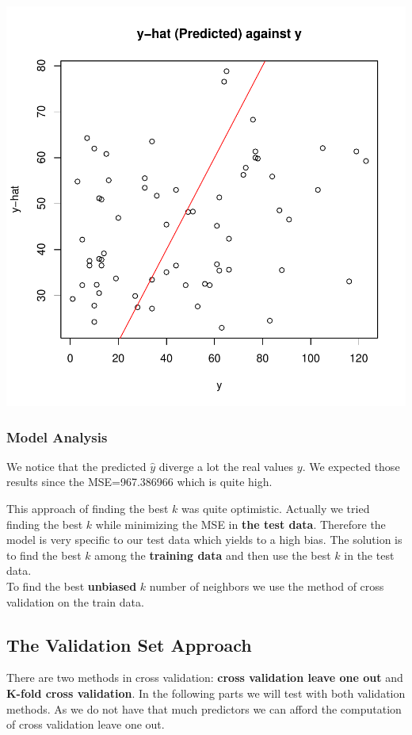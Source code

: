 \documentclass[]{report}
\begin{document}
\begin{center}
	\includegraphics{Figures/knn_predicted_test.pdf}
\end{center}

\subsubsection{Model Analysis}

We notice that the predicted {$\hat{y}$} diverge a lot the real values $y$. We expected those results since the MSE=967.386966 which is quite high. 

This approach of finding the best $k$ was quite optimistic. Actually we tried finding the best $k$ while minimizing the MSE in \textbf{the test data}. Therefore the model is very specific to our test data which yields to a high bias. The solution is to find the best $k$ among the \textbf{training data} and then use the best $k$ in the test data. \\ To find the best \textbf{unbiased} $k$ number of neighbors we use the method of cross validation on the train data. 

\subsection{The Validation Set Approach}
There are two methods in cross validation: \textbf{cross validation leave one out} and  \textbf{K-fold cross validation}. In the following parts we will test with both validation methods. As we do not have that much predictors we can afford the computation of cross validation leave one out.\\
\end{document}

